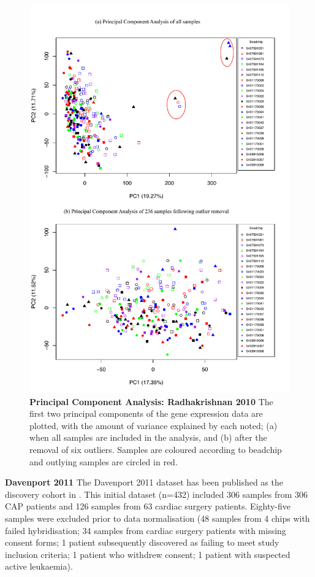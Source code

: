 \FloatBarrier
\begin{figure}[htbp]
\centering
\includegraphics[scale=0.7]{./Results3/Images/PCA_Radhakrishnan2010.pdf}
\caption[Principal Component Analysis: Radhakrishnan 2010]{\textbf{Principal Component Analysis: Radhakrishnan 2010} The first two principal components of the gene expression data are plotted, with the amount of variance explained by each noted; (a) when all samples are included in the analysis, and (b) after the removal of six outliers. Samples are coloured according to beadchip and outlying samples are circled in red.}
\label{fig:PCAJay}
\end{figure}

\textbf{Davenport 2011}
The Davenport 2011 dataset has been published as the discovery cohort in \cite{Davenport2016}. This initial dataset (n=432) included 306 samples from 306 CAP patients and 126 samples from 63 cardiac surgery patients. Eighty-five samples were excluded prior to data normalisation (48 samples from 4 chips with failed hybridisation; 34 samples from cardiac surgery patients with missing consent forms; 1 patient subsequently discovered as failing to meet study inclusion criteria; 1 patient who withdrew consent; 1 patient with suspected active leukaemia). 

